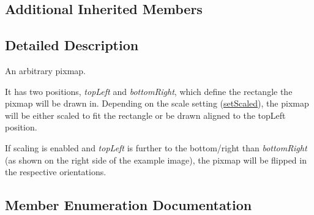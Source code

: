 \subsection*{Additional Inherited Members}


\subsection{Detailed Description}
An arbitrary pixmap. 

 It has two positions, {\itshape top\+Left} and {\itshape bottom\+Right}, which define the rectangle the pixmap will be drawn in. Depending on the scale setting (\hyperlink{class_q_c_p_item_pixmap_ab4d44529a1c6c8d37d0ea7560e042777}{set\+Scaled}), the pixmap will be either scaled to fit the rectangle or be drawn aligned to the top\+Left position.

If scaling is enabled and {\itshape top\+Left} is further to the bottom/right than {\itshape bottom\+Right} (as shown on the right side of the example image), the pixmap will be flipped in the respective orientations. 

\subsection{Member Enumeration Documentation}
\hypertarget{class_q_c_p_item_pixmap_a0ea7f65edb7395e02de521915f221174}{}
